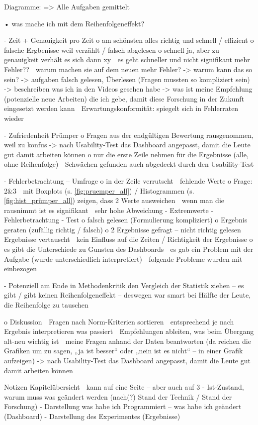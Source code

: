 Diagramme:
=> Alle Aufgaben gemittelt

•	was mache ich mit dem Reihenfolgeneffekt?

-	Zeit + Genauigkeit pro Zeit
o	am schönsten alles richtig und schnell / effizient
o	falsche Ergbenisse weil verzählt / falsch abgelesen
o	schnell ja, aber zu genauigkeit verhält es sich dann xy
 es geht schneller und nicht signifikant mehr Fehler?? 
 warum machen sie auf dem neuen mehr Fehler?
-> warum kann das so sein?
-> aufgaben falsch gelesen, Überlesen (Fragen mussten so kompliziert sein)
-> beschreiben was ich in den Videos gesehen habe
-> was ist meine Empfehlung (potenzielle neue Arbeiten) die ich gebe, damit diese Forschung in der Zukunft eingesetzt werden kann
 Erwartungskonformität: spiegelt sich in Fehlerraten wieder

-	Zufriedenheit Prümper
o	Fragen aus der endgültigen Bewertung rausgenommen, weil zu konfus
-> nach Usability-Test das Dashboard angepasst, damit die Leute gut damit arbeiten können
o	nur die erste Zeile nehmen für die Ergebnisse (alle, ohne Reihenfolge)
 Schwächen gefunden auch abgedeckt durch den Usability-Test

-	Fehlerbetrachtung – Umfrage
o	in der Zeile verrutscht  fehlende Werte
o	Frage: 2&3
	mit Boxplots (s. \autoref{fig:pruemper_all}) / Histogrammen (s. \autoref{fig:hist_prümper_all}) zeigen, dass 2 Werte ausweichen
	wenn man die rausnimmt ist es signifikant
	sehr hohe Abweichung - Extremwerte
-	Fehlerbetrachtung - Test
o	falsch gelesen (Formulierung kompliziert)
o	Ergebnis geraten (zufällig richtig / falsch)
o	2 Ergebnisse gefragt – nicht richtig gelesen
 Ergebnisse vertauscht
 kein Einfluss auf die Zeiten / Richtigkeit der Ergebnisse
o	es gibt die Unterschiede zu Gunsten des Dashboards
 es gab ein Problem mit der Aufgabe (wurde unterschiedlich interpretiert)
 folgende Probleme wurden mit einbezogen

-	Potenziell am Ende in Methodenkritik den Vergleich der Statistik ziehen – es gibt / gibt keinen Reihenfolgeneffekt – deswegen war smart bei Hälfte der Leute, die Reihenfolge zu tauschen

o	Diskussion
	Fragen nach Norm-Kriterien sortieren
 entsprechend je nach Ergebnis interpretieren was passiert
	Empfehlungen ableiten, was beim Übergang alt-neu wichtig ist
 meine Fragen anhand der Daten beantworten (da reichen die Grafiken um zu sagen, „ja ist besser“ oder „nein ist es nicht“ – in einer Grafik aufzeigen)
-> nach Usability-Test das Dashboard angepasst, damit die Leute gut damit arbeiten können

Notizen Kapitelübersicht
 kann auf eine Seite – aber auch auf 3
-	Ist-Zustand, warum muss was geändert werden (nach(?) Stand der Technik / Stand der Forschung)
-	Darstellung was habe ich Programmiert – was habe ich geändert (Dashboard)
-	Darstellung des Experimentes (Ergebnisse)
